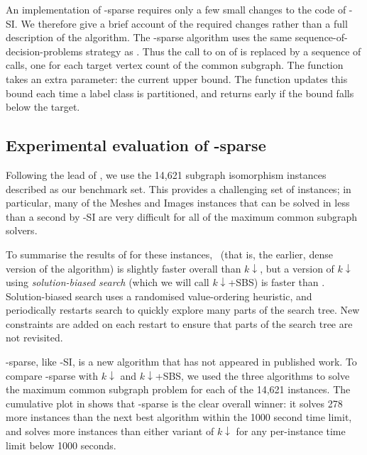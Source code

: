 An implementation of \McSplit-sparse
requires only a few small changes to the code of \McSplit-SI. We
therefore give a brief account of the required changes rather than a full
description of the algorithm.  The \McSplit-sparse algorithm uses the same
sequence-of-decision-problems strategy as \McSplitDown. Thus the call to
 on  of 
is replaced by a sequence of calls, one for each target
vertex count of the common
subgraph.  The  function takes an extra parameter: the current
upper bound. The  function updates this bound each time a label
class is partitioned, and returns early if the bound falls below the target.

\subsection{Experimental evaluation of \McSplit-sparse}

Following the lead of \cite{DBLP:conf/cpaior/ArchibaldDHMP019},
we use the 14,621 subgraph isomorphism instances described
 as our benchmark set.
This provides a challenging set of instances; in particular,
many of the Meshes and Images instances that can be solved in less
than a second by \McSplit-SI are very difficult for all of the maximum
common subgraph solvers.

To summarise the results of \cite{DBLP:conf/cpaior/ArchibaldDHMP019}
for these instances, \McSplitDown\ (that is, the earlier, dense version
of the algorithm) is slightly faster overall than
$k\downarrow$, but a version of $k\downarrow$ using \emph{solution-biased
search} (which we will call $k\downarrow$+SBS) is faster than
\McSplitDown.  Solution-biased search uses a randomised value-ordering
heuristic, and periodically restarts search to quickly
explore many parts of the search tree.  New constraints are added
on each restart to ensure that parts of the search tree are not
revisited.

\McSplit-sparse, like \McSplit-SI, is a new algorithm that
has not appeared in published work.
To compare \McSplit-sparse with $k\downarrow$ and $k\downarrow$+SBS,
we used the three algorithms to solve the maximum
common subgraph problem for each of the 14,621 instances.
The cumulative plot in  
shows that \McSplit-sparse is the clear overall winner: it solves
278 more instances than the next best algorithm within the 1000 second
time limit, and solves more instances than either variant of $k\downarrow$
for any per-instance time limit below 1000 seconds.

